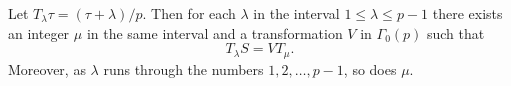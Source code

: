 Let $T_\lambda\tau = (\tau + \lambda)/p$. Then for each $\lambda$ in the interval $1 \leq \lambda \leq p - 1$ there exists an integer $\mu$ in the same interval and a transformation $V$ in $\Gamma_0(p)$ such that
$$T_\lambda S = V T_\mu.$$
Moreover, as $\lambda$ runs through the numbers $1, 2, \ldots, p - 1$, so does $\mu$.
